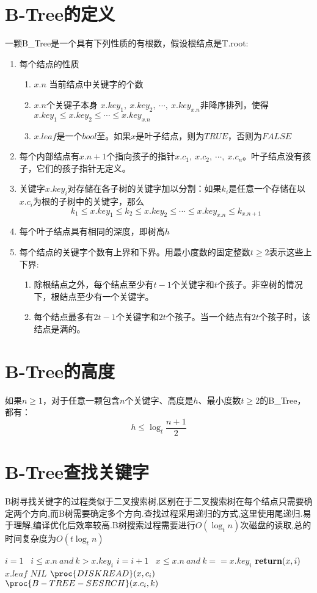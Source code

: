 \documentclass[12pt]{article}
\begin{document}
	\newpage
	\section{B-Tree的定义}
	一颗B\_Tree是一个具有下列性质的有根数，假设根结点是T.root:
	\begin{enumerate}
		\item 每个结点的性质
		\begin{enumerate}
			\item $x.n$ 当前结点中关键字的个数
			\item $x.n$个关键子本身 $x.key_1,\ x.key_2,\ \cdots,\ x.key_{x.n}$非降序排列，使得$x.key_1 \leqslant x.key_2 \leqslant \cdots \leqslant x.key_{x.n}$
			\item  $x.leaf$是一个$bool$至。如果$x$是叶子结点，则为$TRUE$，否则为$FALSE$
		\end{enumerate}
		\item 每个内部结点有$x.n+1$个指向孩子的指针$x.c_1,\ x.c_2,\ \cdots,\ x.c_n$。叶子结点没有孩子，它们的孩子指针无定义。
		\item 关键字$x.key_i$对存储在各子树的关键字加以分割：如果$k_i$是任意一个存储在以$x.c_i$为根的子树中的关键字，那么
		\[k_1\leqslant x.key_1\leqslant k_2\leqslant x.key_2\leqslant\cdots\leqslant x.key_{x.n}\leqslant k_{x.n+1}\]
		\item 每个叶子结点具有相同的深度，即树高$h$
		\item 每个结点的关键字个数有上界和下界。用最小度数的固定整数$t\geqslant 2$表示这些上下界:
		\begin{enumerate}
			\item 除根结点之外，每个结点至少有$t-1$个关键字和$t$个孩子。非空树的情况下，根结点至少有一个关键字。
			\item 每个结点最多有$2t-1$个关键字和$2t$个孩子。当一个结点有$2t$个孩子时，该结点是满的。
		\end{enumerate}
	\end{enumerate}
	\section{B-Tree的高度}
	如果$n\geqslant 1$，对于任意一颗包含$n$个关键字、高度是$h$、最小度数$t\geqslant 2$的B\_Tree，都有：
	\[h\leqslant \log_{t}{\dfrac{n+1}{2}}\]
	
	\section{B-Tree查找关键字}
	B树寻找关键字的过程类似于二叉搜索树,区别在于二叉搜索树在每个结点只需要确定两个方向,而B树需要确定多个方向.查找过程采用递归的方式,这里使用尾递归.易于理解,编译优化后效率较高.B树搜索过程需要进行$O(\log_tn)$次磁盘的读取,总的时间复杂度为$O(t\log_tn)$
	   \begin{codebox}
	 	\li $i=1$
	 	\li \While \ $i\leqslant x.n\ and \ k>x.key_i$
	 	\li \Then
	 			$i=i+1$
	 		\End
	 	\li \If\ $x\leqslant x.n\ and\ k==x.key_i$
	 	\li \Then
	 			$\Return (x,i)$
	 		\End
	 	\li \ElseIf $x.leaf$
	 	\li    \Then \Return $NIL$
	 	    \End
	 	\li \Else 
	 	\li \Then$\proc{DISK\-READ}(x,c_i)$
	 	\li  \qquad\quad  \Return $\proc{B-TREE-SESRCH}(x.c_i,k)$
	 	    \End
	   \end{codebox}
\end{document}
